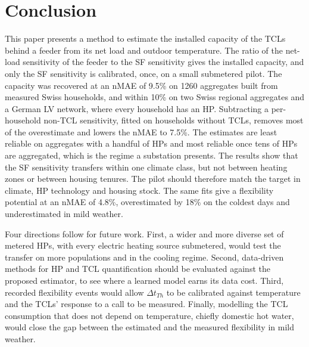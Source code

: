 \section{Conclusion}
\label{sec:conclusion}

This paper presents a method to estimate the installed capacity of the TCLs behind a feeder from its net load and outdoor temperature. The ratio of the net-load sensitivity of the feeder to the SF sensitivity gives the installed capacity, and only the SF sensitivity is calibrated, once, on a small submetered pilot. The capacity was recovered at an nMAE of 9.5\% on 1260 aggregates built from measured Swiss households, and within 10\% on two Swiss regional aggregates and a German LV network, where every household has an HP. Subtracting a per-household non-TCL sensitivity, fitted on households without TCLs, removes most of the overestimate and lowers the nMAE to 7.5\%. The estimates are least reliable on aggregates with a handful of HPs and most reliable once tens of HPs are aggregated, which is the regime a substation presents. The results show that the SF sensitivity transfers within one climate class, but not between heating zones or between housing tenures. The pilot should therefore match the target in climate, HP technology and housing stock. The same fits give a flexibility potential at an nMAE of 4.8\%, overestimated by 18\% on the coldest days and underestimated in mild weather.

Four directions follow for future work. First, a wider and more diverse set of metered HPs, with every electric heating source submetered, would test the transfer on more populations and in the cooling regime. Second, data-driven methods for HP and TCL quantification should be evaluated against the proposed estimator, to see where a learned model earns its data cost. Third, recorded flexibility events would allow $\Delta t_{Th}$ to be calibrated against temperature and the TCLs' response to a call to be measured. Finally, modelling the TCL consumption that does not depend on temperature, chiefly domestic hot water, would close the gap between the estimated and the measured flexibility in mild weather.
